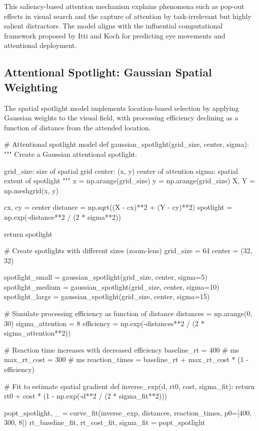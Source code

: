 \documentclass[a4paper, 11pt]{article}
\begin{document}
This saliency-based attention mechanism explains phenomena such as pop-out effects in visual search and the capture of attention by task-irrelevant but highly salient distractors. The model aligns with the influential computational framework proposed by Itti and Koch for predicting eye movements and attentional deployment.

\subsection{Attentional Spotlight: Gaussian Spatial Weighting}

The spatial spotlight model implements location-based selection by applying Gaussian weights to the visual field, with processing efficiency declining as a function of distance from the attended location.

\begin{pycode}
# Attentional spotlight model
def gaussian_spotlight(grid_size, center, sigma):
    """
    Create a Gaussian attentional spotlight.

    grid_size: size of spatial grid
    center: (x, y) center of attention
    sigma: spatial extent of spotlight
    """
    x = np.arange(grid_size)
    y = np.arange(grid_size)
    X, Y = np.meshgrid(x, y)

    cx, cy = center
    distance = np.sqrt((X - cx)**2 + (Y - cy)**2)
    spotlight = np.exp(-distance**2 / (2 * sigma**2))

    return spotlight

# Create spotlights with different sizes (zoom-lens)
grid_size = 64
center = (32, 32)

spotlight_small = gaussian_spotlight(grid_size, center, sigma=5)
spotlight_medium = gaussian_spotlight(grid_size, center, sigma=10)
spotlight_large = gaussian_spotlight(grid_size, center, sigma=15)

# Simulate processing efficiency as function of distance
distances = np.arange(0, 30)
sigma_attention = 8
efficiency = np.exp(-distances**2 / (2 * sigma_attention**2))

# Reaction time increases with decreased efficiency
baseline_rt = 400  # ms
max_rt_cost = 300  # ms
reaction_times = baseline_rt + max_rt_cost * (1 - efficiency)

# Fit to estimate spatial gradient
def inverse_exp(d, rt0, cost, sigma_fit):
    return rt0 + cost * (1 - np.exp(-d**2 / (2 * sigma_fit**2)))

popt_spotlight, _ = curve_fit(inverse_exp, distances, reaction_times,
                               p0=[400, 300, 8])
rt_baseline_fit, rt_cost_fit, sigma_fit = popt_spotlight
\end{pycode}
\end{document}
